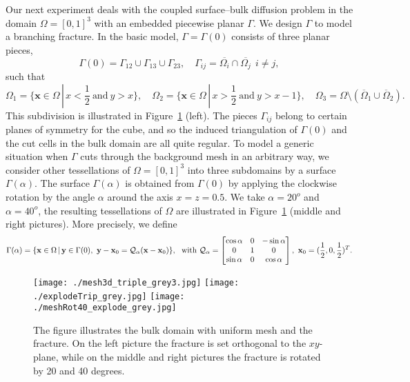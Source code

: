 \documentclass{article}
\newcommand{\bx}{\mathbf x}
\newcommand{\by}{\mathbf y}
\begin{document}
Our next experiment deals with the coupled surface--bulk diffusion problem in the domain $\Omega = [0,1]^3$ with
an embedded piecewise planar $\Gamma$. We design $\Gamma$ to model a branching fracture.  In the basic model,
$\Gamma=\Gamma(0)$ consists of three planar pieces,
\[\Gamma(0) = \Gamma_{12}\cup\Gamma_{13}\cup\Gamma_{23},\quad \Gamma_{ij}=\overline{\Omega_i}\cap\overline{\Omega_j}~~i\neq j,
\]
such that
\[
\Omega_{1}=\{\bx\in\Omega\,|\, x<\frac12~\text{and}~ y>x\},\quad \Omega_{2}=\{\bx\in\Omega\,|\, x>\frac12~\text{and}~y>x-1\},\quad
\Omega_{3}=\Omega\setminus(\overline{\Omega}_{1}\cup\overline{\Omega}_2).
\]
This subdivision is illustrated in Figure~\ref{fig:triple} (left). The pieces $\Gamma_{ij}$ belong to certain planes of symmetry
for the cube, and so the induced triangulation of $\Gamma(0)$ and the cut cells in the bulk domain are all quite regular.
To model a generic situation when $\Gamma$ cuts through the background mesh in an arbitrary way, we  consider other
tessellations of $\Omega = [0,1]^3$ into three subdomains by a surface $\Gamma(\alpha)$. The surface $\Gamma(\alpha)$ is obtained from $\Gamma(0)$ by applying the clockwise rotation by the angle $\alpha$ around the axis $x=z=0.5$. We take $\alpha=20^o$ and
$\alpha=40^o$, the resulting tessellations of $\Omega$ are illustrated in  Figure~\ref{fig:triple} (middle and right pictures).
More precisely, we define
\[
\Gamma(\alpha)=\{\bx\in\Omega\,|\, \by\in\Gamma(0),~\by-\bx_0=\mathcal{Q}_\alpha(\bx-\bx_0)\},~~\text{with}~
\mathcal{Q}_\alpha=\begin{bmatrix}\cos\alpha&0&-\sin\alpha\\ 0&1&0\\ \sin\alpha&0&\cos\alpha\end{bmatrix},~ \bx_0=({\footnotesize\frac12},0,{\footnotesize\frac12})^T.
\]


\begin{figure}[ht!]
\begin{center}
\texttt{[image: ./mesh3d\_triple\_grey3.jpg]} \texttt{[image: ./explodeTrip\_grey.jpg]} \texttt{[image: ./meshRot40\_explode\_grey.jpg]}
\caption{\label{fig:triple}
The figure illustrates the bulk domain with uniform mesh and the fracture. On the left picture the fracture is set orthogonal to the $xy$-plane, while on the middle and right pictures the fracture is rotated by 20 and 40 degrees.}
\end{center}
\end{figure}
\end{document}

